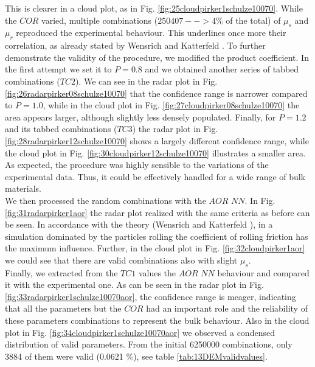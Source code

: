 This is clearer in a cloud plot, as in Fig. 
\ref{fig:25cloudpirker1schulze10070}. While the $COR$ varied, multiple
combinations ($250407 --> 4\% $ of the total) of $\mu_s$ and $\mu_r$ reproduced
the experimental behaviour.
This underlines once more their correlation, as already stated by Wensrich and 
Katterfeld \cite{RefWorks:87}.
To further demonstrate the validity of the procedure, we modified the product
coefficient. In the first attempt we set it to $P=0.8$ and we obtained another
series of tabbed combinations ($TC2$).
We can see in the radar plot in Fig.
\ref{fig:26radarpirker08schulze10070} that the confidence range is narrower
compared to $P=1.0$, while in the cloud plot in Fig. 
\ref{fig:27cloudpirker08schulze10070} the area
appears larger, although slightly less densely populated. Finally, for $P=1.2$
and its tabbed combinations ($TC3$) the radar plot in Fig.
\ref{fig:28radarpirker12schulze10070} shows a largely different confidence
range, while the cloud plot in Fig. \ref{fig:30cloudpirker12schulze10070} 
illustrates a smaller area. As expected, the procedure was highly sensible to the variations of the experimental data. 
Thus, it could be effectively handled for a wide range of bulk materials.\\
% 
We then processed the random combinations with the $AOR$ $NN$. In Fig.
\ref{fig:31radarpirker1aor} the radar plot realized with the same criteria as
before can be seen.
In accordance with the theory (Wensrich and Katterfeld \cite{RefWorks:87}), in a simulation dominated
by the particles rolling the coefficient of rolling friction has the maximum influence. 
Further, in the cloud plot in Fig. \ref{fig:32cloudpirker1aor}
we could see that there are valid combinations also with slight $\mu_s$. \\
Finally, we extracted from the $TC1$ values the $AOR$ $NN$ behaviour
and compared it with the experimental one.
As can be seen in the radar plot in Fig.
\ref{fig:33radarpirker1schulze10070aor}, the confidence range is meager, indicating that all the parameters but the $COR$ 
had an important role and the reliability of these parameters combinations to represent the bulk behaviour. 
Also in the cloud plot in Fig. \ref{fig:34cloudpirker1schulze10070aor} we
observed a condensed distribution of valid parameters.
From the initial 6250000 combinations, only 3884 of them were valid (0.0621 \%),
see table \ref{tab:13DEMvalidvalues}.



%
%
%






